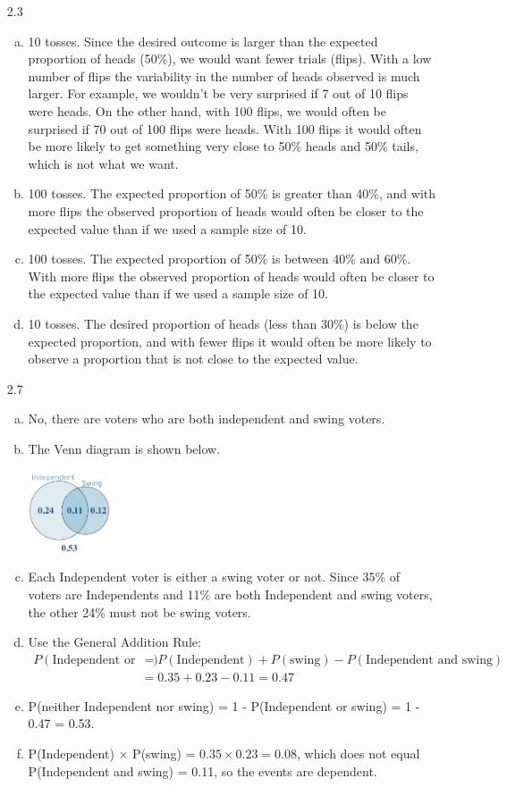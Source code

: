 \documentclass[11pt]{article}
\newenvironment{parts}{
\vspace{-0.25cm}
\begin{enumerate}[(a)]
\setlength{\itemsep}{0mm}
}
{\end{enumerate}
}
\begin{document}
\begin{enumerate}
\item[2.3]
\begin{parts}
\item 10 tosses. Since the desired outcome is larger than the expected proportion of heads (50\%), we would want fewer trials (flips). With a low number of flips the variability in the number of heads observed is much larger. For example, we wouldn't be very surprised if 7 out of 10 flips were heads. On the other hand, with 100 flips, we would often be surprised if 70 out of 100 flips were heads. With 100 flips it would often be more likely to get something very close to 50\% heads and 50\% tails, which is not what we want.
\item 100 tosses. The expected proportion of 50\% is greater than 40\%, and with more flips the observed proportion of heads would often be closer to the expected value than if we used a sample size of 10.
\item 100 tosses. The expected proportion of 50\% is between 40\% and 60\%. With more flips the observed proportion of heads would often be closer to the expected value than if we used a sample size of 10.
\item 10 tosses. The desired proportion of heads (less than 30\%) is below the expected proportion, and with fewer flips it would often be more likely to observe a proportion that is not close to the expected value.
\end{parts}

\item[2.7] 
\begin{parts}
\item No, there are voters who are both independent and swing voters.
\item The Venn diagram is shown below.
  \begin{center}
\includegraphics[width=0.2\textwidth]{figures/02/indepSwing}
  \end{center}
\item Each Independent voter is either a swing voter or not. Since 35\% of voters are Independents and 11\% are both Independent and swing voters, the other 24\% must not be swing voters.
\item Use the General Addition Rule:
\begin{align*}
P(\text{Independent or swing}) &= P(\text{Independent}) + P(\text{swing}) - P(\text{Independent and swing}) \\
&= 0.35 + 0.23 - 0.11 = 0.47
\end{align*}
\item P(neither Independent nor swing) = 1 - P(Independent or swing)  = 1 - 0.47 = 0.53.
\item P(Independent) $\times$ P(swing) = $0.35\times0.23 = 0.08$, which does not equal P(Independent and swing) = 0.11, so the events are dependent.
\end{parts}


\end{enumerate}
\end{document}
